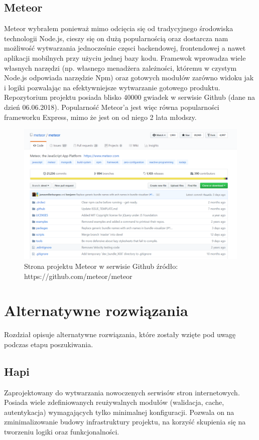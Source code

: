 \documentclass[12pt]{report}
\begin{document}
    \subsection{Meteor}
      Meteor wybrałem ponieważ mimo odcięcia się od tradycyjnego środowiska technologii Node.js, cieszy się on dużą popularnością oraz dostarcza nam możliwość wytwarzania jednocześnie częsci backendowej, frontendowej a nawet aplikacji mobilnych przy użyciu jednej bazy kodu.
      Framewok wprowadza wiele własnych narzędzi (np. własnego menadżera zależności, któremu w czystym Node.js odpowiada narzędzie Npm) oraz gotowych modułów zarówno widoku jak i logiki pozwalając na efektywniejsze wytwarzanie gotowego produktu.
      Repozytorium projektu posiada blisko 40000 gwiadek w serwisie Github (dane na dzień 06.06.2018).
      Popularność Meteor'a jest więc równa popularności frameworku Express, mimo że jest on od niego 2 lata młodszy.
      \begin{figure}[!hb]
        \centering
        \includegraphics[width=\textwidth,height=\textheight,keepaspectratio]{meteor.png} 
        \caption{Strona projektu Meteor w serwisie Github \newline źródło: https://github.com/meteor/meteor}
      \end{figure}
  
  \section{Alternatywne rozwiązania}
    Rozdział opisuje alternatywne rozwiązania, które zostały wzięte pod uwagę podczas etapu poszukiwania.

    \subsection{Hapi}
    Zaprojektowany do wytwarzania nowoczenych serwisów stron internetowych.
    Posiada wiele zdefiniowanych reużywalnych modułów (walidacja, cache, autentykacja) wymagających tylko minimalnej konfiguracji.
    Pozwala on na zminimalizowanie budowy infrastruktury projektu, na korzyść skupienia się na tworzeniu logiki oraz funkcjonalności.
\end{document}
